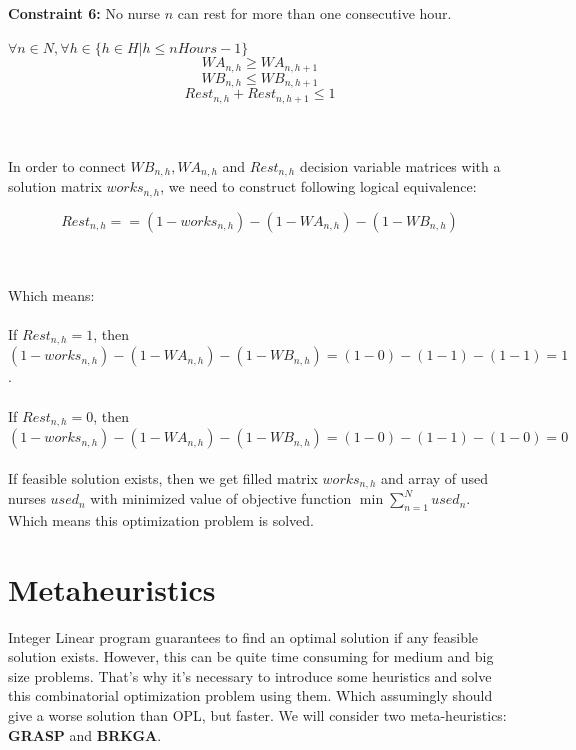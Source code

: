 \documentclass{article}
\newcommand\tab[1][1cm]{\hspace*{#1}}
\begin{document}
\tab \textbf{Constraint 6:} No nurse $n$ can rest for more than one consecutive hour.\\
\begin{minipage}{\linewidth}
	\medskip $\forall n \in N, \forall h \in \{h \in H|h \leq nHours-1 \}$
	\begin{equation}
		WA_{n,h} \geq WA_{n,h+1}
	\end{equation}
	\begin{equation}
		WB_{n,h} \leq WB_{n,h+1}
	\end{equation}
	\begin{equation}
		Rest_{n,h} + Rest_{n,h+1} \leq 1
	\end{equation}
\end{minipage}
\\\\
\tab In order to connect $WB_{n,h}, WA_{n,h}$ and $Rest_{n,h}$ decision variable matrices with a solution matrix $works_{n,h}$, we need to construct following logical equivalence:\\
\begin{minipage}{\linewidth}
	\begin{equation}
		Rest_{n,h} == (1-works_{n,h}) - (1-WA_{n,h}) - (1-WB_{n,h})
	\end{equation}
\end{minipage}
\\\\
\tab Which means:\\\\
If $Rest_{n,h} = 1$, then $(1-works_{n,h}) - (1-WA_{n,h}) - (1-WB_{n,h}) = (1-0) - (1-1) - (1-1) = 1$.\\\\
If $Rest_{n,h} = 0$, then $(1-works_{n,h}) - (1-WA_{n,h}) - (1-WB_{n,h}) = (1-0) - (1-1) - (1-0) = 0$\\\\

If feasible solution exists, then we get filled matrix $works_{n,h}$ and array of used nurses $used_n$ with minimized value of objective function $\min \sum_{n=1}^N used_n$. Which means this optimization problem is solved.
	\section{Metaheuristics}
\tab Integer Linear program guarantees to find an optimal solution if any feasible solution exists. However, this can be quite time consuming for medium and big size problems. That's why it's necessary to introduce some heuristics and solve this combinatorial optimization problem using them. Which assumingly should give a worse solution than OPL, but faster. We will consider two meta-heuristics: \textbf{GRASP} and \textbf{BRKGA}.
\end{document}
